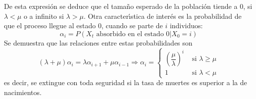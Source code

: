 De esta expresi\'{o}n se deduce que el tama\~{n}o esperado de la poblaci\'{o}n
tiende a 0, si $\lambda<\mu$ o a infinito si $\lambda>\mu$. Otra
caracter\'{\i}stica de inter\'{e}s es la probabilidad de que el proceso
llegue al estado 0, cuando se parte de $i$ individuos:
\[
\alpha_i=P(X_t \text{ absorbido en el estado 0}|X_0=i)
\]
Se demuestra que las relaciones entre estas probabilidades son
\[
(\lambda+\mu)\alpha_i=\lambda \alpha_{i+1}+\mu
\alpha_{i-1}\Rightarrow \alpha_i=\left \{
\begin{array}{ll}
\left(\dfrac{\mu}{\lambda}\right)^i&\text{ si } \lambda \geq \mu\\
1&\text{ si }\lambda < \mu
\end{array}\right.
\]
es decir, se extingue con toda seguridad si la tasa de muertes es
superior a la de nacimientos.
